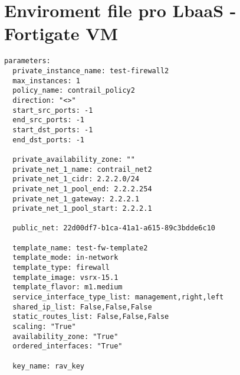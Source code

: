 \chapter{Enviroment file pro LbaaS - Fortigate VM}
\begin{lstlisting}
parameters:
  private_instance_name: test-firewall2
  max_instances: 1
  policy_name: contrail_policy2
  direction: "<>"
  start_src_ports: -1
  end_src_ports: -1
  start_dst_ports: -1
  end_dst_ports: -1

  private_availability_zone: ""
  private_net_1_name: contrail_net2
  private_net_1_cidr: 2.2.2.0/24
  private_net_1_pool_end: 2.2.2.254
  private_net_1_gateway: 2.2.2.1
  private_net_1_pool_start: 2.2.2.1

  public_net: 22d00df7-b1ca-41a1-a615-89c3bdde6c10

  template_name: test-fw-template2
  template_mode: in-network
  template_type: firewall
  template_image: vsrx-15.1
  template_flavor: m1.medium
  service_interface_type_list: management,right,left
  shared_ip_list: False,False,False
  static_routes_list: False,False,False
  scaling: "True"
  availability_zone: "True"
  ordered_interfaces: "True"

  key_name: rav_key
\end{lstlisting}




